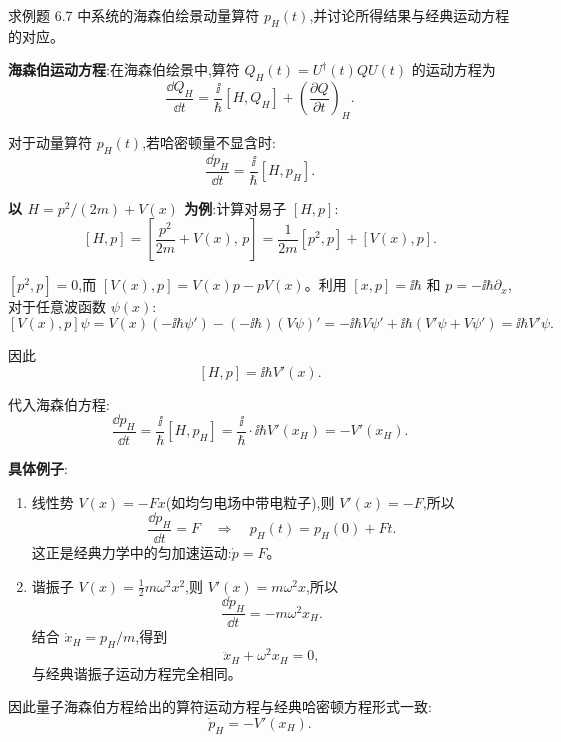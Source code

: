 \begin{question}
求例题 6.7 中系统的海森伯绘景动量算符 $p_H(t)$,并讨论所得结果与经典运动方程的对应。
\begin{solution}
	\textbf{海森伯运动方程}:在海森伯绘景中,算符 $Q_H(t)=U^\dagger(t)Q U(t)$ 的运动方程为
	\[
	\frac{\dd Q_H}{\dd t} = \frac{\ii}{\hbar}[H,Q_H] + \left(\frac{\partial Q}{\partial t}\right)_H.
	\]

	对于动量算符 $p_H(t)$,若哈密顿量不显含时:
	\[
	\frac{\dd p_H}{\dd t} = \frac{\ii}{\hbar}[H,p_H].
	\]

	\textbf{以 $H=p^2/(2m)+V(x)$ 为例}:计算对易子 $[H,p]$:
	\[
	[H,p] = \left[\frac{p^2}{2m}+V(x),\,p\right]
	= \frac{1}{2m}[p^2,p] + [V(x),p].
	\]

	$[p^2,p]=0$,而 $[V(x),p] = V(x)p - pV(x)$。利用 $[x,p]=\ii\hbar$ 和 $p=-\ii\hbar\partial_x$,对于任意波函数 $\psi(x)$:
	\[
	[V(x),p]\psi = V(x)(-\ii\hbar\psi') - (-\ii\hbar)(V\psi)' = -\ii\hbar V\psi' + \ii\hbar(V'\psi+V\psi') = \ii\hbar V'\psi.
	\]

	因此
	\[
	[H,p] = \ii\hbar V'(x).
	\]

	代入海森伯方程:
	\[
	\frac{\dd p_H}{\dd t} = \frac{\ii}{\hbar}[H,p_H] = \frac{\ii}{\hbar}\cdot\ii\hbar V'(x_H) = -V'(x_H).
	\]

	\textbf{具体例子}:
	\begin{enumerate}
	\item 线性势 $V(x) = -Fx$(如均匀电场中带电粒子),则 $V'(x) = -F$,所以
	\[
	\frac{\dd p_H}{\dd t} = F \quad\Longrightarrow\quad p_H(t) = p_H(0) + Ft.
	\]
	这正是经典力学中的匀加速运动:$\dot p = F$。

	\item 谐振子 $V(x)=\frac12 m\omega^2 x^2$,则 $V'(x)=m\omega^2 x$,所以
	\[
	\frac{\dd p_H}{\dd t} = -m\omega^2 x_H.
	\]
	结合 $\dot x_H = p_H/m$,得到
	\[
	\ddot x_H + \omega^2 x_H = 0,
	\]
	与经典谐振子运动方程完全相同。
	\end{enumerate}

	因此量子海森伯方程给出的算符运动方程与经典哈密顿方程形式一致:
	\[
	\boxed{\dot p_H = -V'(x_H)}.
	\]
	\end{solution}
\end{question}

